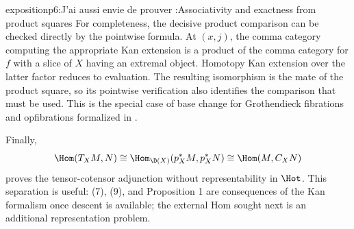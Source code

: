 \begin{dcomment}{exposition}{p6:J’ai aussi envie de prouver :}{Associativity and exactness from product squares}
For completeness, the decisive product comparison can be checked directly by the pointwise formula. At \((x,j)\), the comma category computing the appropriate Kan extension is a product of the comma category for \(f\) with a slice of \(X\) having an extremal object. Homotopy Kan extension over the latter factor reduces to evaluation. The resulting isomorphism is the mate of the product square, so its pointwise verification also identifies the comparison that must be used. This is the special case of base change for Grothendieck fibrations and opfibrations formalized in \citet[Proposition 1.24]{Groth2013}.

Finally,
\[
 \Hom(T_XM,N)
 \cong\Hom_{\D(X)}(p_X^*M,p_X^*N)
 \cong\Hom(M,C_XN)
\]
proves the tensor-cotensor adjunction without representability in \(\Hot\). This separation is useful: (7), (9), and Proposition 1 are consequences of the Kan formalism once descent is available; the external Hom sought next is an additional representation problem.
\end{dcomment}

